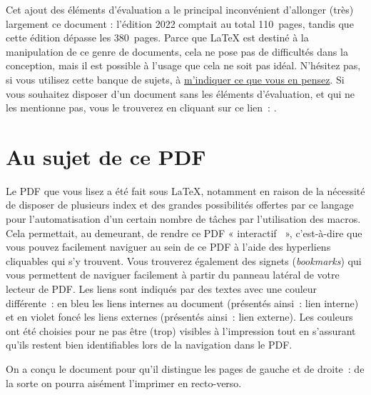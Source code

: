 Cet ajout des éléments d'évaluation a le principal inconvénient d'allonger (très) largement ce document : l'édition 2022 comptait au total 110~pages, tandis que cette édition dépasse les 380~pages. Parce que \LaTeX{} est destiné à la manipulation de ce genre de documents, cela ne pose pas de difficultés dans la conception, mais il est possible à l'usage que cela ne soit pas idéal. N'hésitez pas, si vous utilisez cette banque de sujets, à \href{mailto:mikael.quesseveur@ac-lille.fr}{m'indiquer ce que vous en pensez}. Si vous souhaitez disposer d'un document sans les éléments d'évaluation, et qui ne les mentionne pas, vous le trouverez en cliquant sur ce lien~: \sujetshlpsanscorr{}.

\section*{Au sujet de ce PDF}

Le PDF que vous lisez a été fait sous \LaTeX{}, notamment en raison de la nécessité de disposer de plusieurs index
et des grandes possibilités offertes par ce langage pour l'automatisation d'un certain nombre de tâches
par l'utilisation des macros. Cela permettait, au demeurant, de rendre ce PDF « interactif ~»{}, c'est-à-dire
que vous pouvez facilement naviguer au sein de ce PDF à l'aide des hyperliens cliquables qui s'y trouvent.
Vous trouverez également des signets (\textit{bookmarks}) qui vous permettent de naviguer facilement à partir du
panneau latéral de votre lecteur de PDF. Les liens sont indiqués par des textes avec une couleur différente~: en bleu les liens internes au document (présentés ainsi~: \textcolor{darkblue!80!black}{lien interne}) et en violet foncé les liens externes (présentés ainsi~: \textcolor{darkviolet!80!black}{lien externe}).
Les couleurs ont été choisies pour ne pas être (trop) visibles à l'impression tout en s'assurant qu'ils restent bien identifiables lors de la navigation dans le PDF.

On a conçu le document pour qu'il distingue les pages de gauche et de droite~: de la sorte on pourra aisément
l'imprimer en recto-verso.

